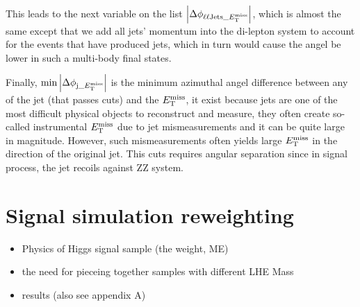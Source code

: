 This leads to the next variable on the list $\abs{\Delta\phi_{\ell\ell\mathrm{Jets}\_E_{\mathrm{T}}^{\mathrm{miss}}}}$, which
is almost the same except that we add all jets' momentum into the di-lepton system to account
for the events that have produced jets, which in turn would cause the angel be lower in such
a multi-body final states.

Finally, $\min{\abs{ \Delta\phi_{\mathrm{j}\_E_{\mathrm{T}}^{\mathrm{miss}}}}}$ is the minimum azimuthal angel difference between
any of the jet (that passes cuts) and the $E_{\mathrm{T}}^{\mathrm{miss}}$, it exist because jets are one of the most difficult 
physical objects to reconstruct and measure, they often create so-called instrumental $E_{\mathrm{T}}^{\mathrm{miss}}$ due to jet
mismeasurements and it can be quite large in magnitude. However, such mismeasurements often yields large
$E_{\mathrm{T}}^{\mathrm{miss}}$ in the direction of the original jet. This cuts requires angular separation since in signal process,
the jet recoils against ZZ system.
\newpage\phantom{blabla}

\section{Signal simulation reweighting}
\begin{itemize}
    \item Physics of Higgs signal sample (the weight, ME)
    \item the need for pieceing together samples with different LHE Mass
    \item results (also see appendix A)
\end{itemize}

